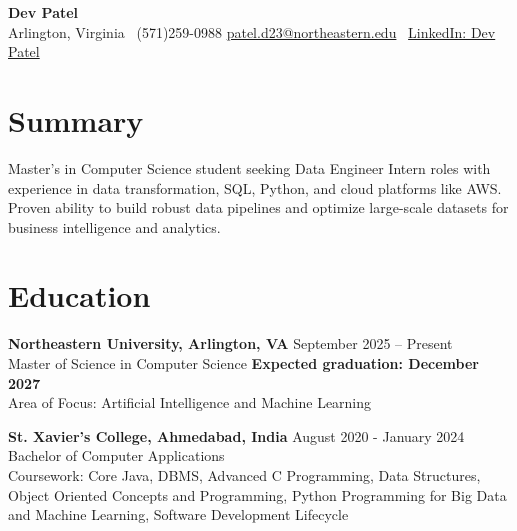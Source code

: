 \documentclass[a4paper,10pt]{article}
\begin{document}
\begin{center}
\vspace{-3mm}
    \fontsize{16}{18}\selectfont \textbf{Dev Patel} \\
    \vspace{0mm}
    \normalsize Arlington, Virginia \textbar\ (571)259-0988  \textbar       \href{mailto:patel.d23@northeastern.edu}{patel.d23@northeastern.edu} \textbar\ \href{https://www.linkedin.com/in/devxpatel//}{LinkedIn: Dev Patel} \\
\end{center}

\section*{Summary}
Master's in Computer Science student seeking Data Engineer Intern roles with experience in data transformation, SQL, Python, and cloud platforms like AWS. Proven ability to build robust data pipelines and optimize large-scale datasets for business intelligence and analytics.
 
\vspace{ 0 mm}
\section*{Education}
\textbf{Northeastern University, Arlington, VA} \hfill September 2025 -- Present\\
Master of Science in Computer Science \hfill \textbf{Expected graduation: December 2027} \\
Area of Focus: Artificial Intelligence and Machine Learning

\vspace{1 mm} %
\textbf{St. Xavier's College, Ahmedabad, India} \hfill August 2020 - January 2024 \\
Bachelor of Computer Applications\\
Coursework: Core Java, DBMS, Advanced C Programming, Data Structures, Object Oriented Concepts and Programming, Python Programming for Big Data and Machine Learning, Software Development Lifecycle
\end{document}
